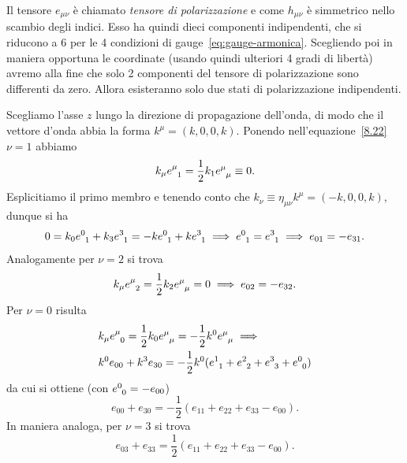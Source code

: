 Il tensore $e_{\mu\nu}$ è chiamato
\emph{tensore di polarizzazione} e come
$h_{\mu\nu}$ è simmetrico nello scambio degli indici.  Esso ha quindi dieci
componenti indipendenti, che si riducono a 6 per le 4 condizioni di
gauge~\eqref{eq:gauge-armonica}.  Scegliendo poi in maniera opportuna le
coordinate (usando quindi ulteriori 4 gradi di libertà) avremo alla fine che
solo 2 componenti del tensore di polarizzazione sono differenti da zero.  Allora
esisteranno solo due stati di polarizzazione indipendenti.

Scegliamo l'asse $z$ lungo la direzione di propagazione dell'onda, di modo che
il vettore d'onda abbia la forma $k^{\mu} = (k, 0, 0, k)$.  Ponendo
nell'equazione~\eqref{8.22} $\nu = 1$ abbiamo
\begin{equation}
  k_{\mu}\tensor{e}{^{\mu}_{1}} = \frac{1}{2} k_{1}\tensor{e}{^{\mu}_{\mu}}
  \equiv 0.
\end{equation}
Esplicitiamo il primo membro e tenendo conto che $k_{\nu} \equiv \eta_{\mu \nu}
k^{\mu} = (-k, 0, 0, k)$, dunque si ha
\begin{equation}
  0 = k_{0} \tensor{e}{^{0}_{1}} + k_{3} \tensor{e}{^{3}_{1}} = -k
  \tensor{e}{^{0}_{1}} + k \tensor{e}{^{3}_{1}} \implies
  \tensor{e}{^{0}_{1}} = \tensor{e}{^{3}_{1}} \implies e_{01} = -e_{31}.
\end{equation}
Analogamente per $\nu = 2$ si trova
\begin{equation}
  k_{\mu} \tensor{e}{^{\mu}_{2}} = \frac{1}{2} k_{2} \tensor{e}{^{\mu}_{\mu}} =
  0 \implies e_{02} = -e_{32}.
\end{equation}
Per $\nu = 0$ risulta
\begin{equation}
  \begin{split}
    &k_{\mu} \tensor{e}{^{\mu}_{0}} = \frac{1}{2} k_{0}\tensor{e}{^{\mu}_{\mu}}
    = -\frac{1}{2}k^{0}\tensor{e}{^{\mu}_{\mu}} \implies \\
    &k^{0} e_{00} + k^{3}e_{30} = -\frac{1}{2}k^{0}(\tensor{e}{^{1}_{1}} +
    \tensor{e}{^{2}_{2}} + \tensor{e}{^{3}_{3}} + \tensor{e}{^0_0})
  \end{split}
\end{equation}
da cui si ottiene (con $\tensor{e}{^0_0} = - e_{00}$)
\begin{equation}
  e_{00} + e_{30} = -\frac{1}{2}(e_{11} + e_{22} + e_{33} - e_{00}).
\end{equation}
In maniera analoga, per $\nu = 3$ si trova
\begin{equation}
  e_{03} + e_{33} = \frac{1}{2}(e_{11} + e_{22} + e_{33} - e_{00}).
\end{equation}
